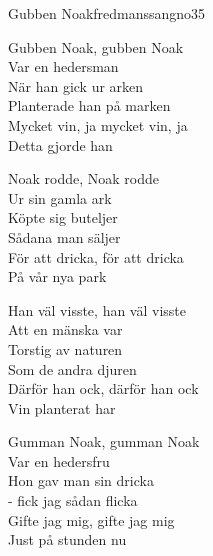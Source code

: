 \begin{song}{Gubben Noak}{fredmanssangno35}
\begin{vers}
Gubben Noak, gubben Noak \\
Var en hedersman\\
När han gick ur arken\\
Planterade han på marken\\
Mycket vin, ja mycket vin, ja\\
Detta gjorde han\\
\end{vers}
\begin{vers}
Noak rodde, Noak rodde \\
Ur sin gamla ark\\
Köpte sig buteljer\\
Sådana man säljer\\
För att dricka, för att dricka\\
På vår nya park\\
\end{vers}


\begin{vers}
Han väl visste, han väl visste \\
Att en mänska var\\
Torstig av naturen\\
Som de andra djuren\\
Därför han ock, därför han ock\\
Vin planterat har\\
\end{vers}

\newp

\begin{vers}
Gumman Noak, gumman Noak \\
Var en hedersfru\\
Hon gav man sin dricka\\
- fick jag sådan flicka\\
Gifte jag mig, gifte jag mig\\
Just på stunden nu\\
\end{vers}
\end{song}
